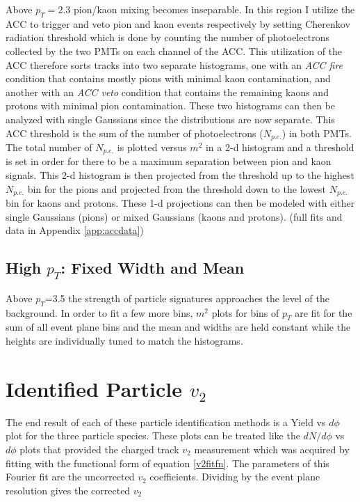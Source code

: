 Above $p_T=2.3$ pion/kaon mixing becomes inseparable. In this region I utilize the ACC to trigger and veto pion and kaon events respectively by setting Cherenkov radiation threshold which is done by counting the number of photoelectrons collected by the two PMTs on each channel of the ACC. This utilization of the ACC therefore sorts tracks into two separate histograms, one with an \textit{ACC fire} condition that contains mostly pions with minimal kaon contamination, and another with an \textit{ACC veto} condition that contains the remaining kaons and protons with minimal pion contamination. These two histograms can then be analyzed with single Gaussians since the distributions are now separate. This ACC threshold is the sum of the number of photoelectrons ($N_{p.e.}$) in both PMTs. The total number of $N_{p.e.}$ is plotted versus $m^2$ in a 2-d histogram and a threshold is set in order for there to be a maximum separation between pion and kaon signals. This 2-d histogram is then projected from the threshold up to the highest $N_{p.e.}$ bin for the pions and projected from the threshold down to the lowest $N_{p.e.}$ bin for kaons and protons. These 1-d projections can then be modeled with either single Gaussians (pions) or mixed Gaussians (kaons and protons). (full fits and data in Appendix \ref{app:accdata})

\subsection{High $p_T$: Fixed Width and Mean}
Above $p_T$=3.5 the strength of particle signatures approaches the level of the background. In order to fit a few more bins, $m^2$ plots for bins of $p_T$ are fit for the sum of all event plane bins and the mean and widths are held constant while the heights are individually tuned to match the histograms. 

\section{Identified Particle $v_{2}$}
The end result of each of these particle identification methods is a Yield vs $d\phi$ plot for the three particle species. These plots can be treated like the $dN/d\phi$ vs $d\phi$ plots that provided the charged track $v_2$ measurement which was acquired by fitting with the functional form of equation \ref{v2fitfn}. The parameters of this Fourier fit are the uncorrected $v_2$ coefficients. Dividing by the event plane resolution gives the corrected $v_2$

